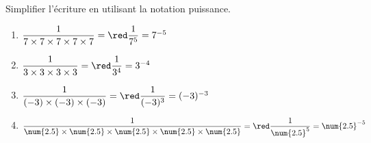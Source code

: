     Simplifier l'écriture en utilisant la notation puissance.
    \begin{spacing}{2}
        \begin{enumerate}
            \item $\dfrac{1}{7\times 7\times 7\times 7\times 7}                                         ={\red \dfrac{1}{7^5}          = 7^{-5}}$
            \item $\dfrac{1}{3\times 3\times 3\times 3}                                                 ={\red \dfrac{1}{3^4}          = 3^{-4}}$
            \item $\dfrac{1}{(-3)\times (-3)\times (-3)}                                                ={\red \dfrac{1}{(-3)^3}       = (-3)^{-3}}$
            \item $\dfrac{1}{\num{2.5}\times \num{2.5}\times \num{2.5}\times \num{2.5}\times \num{2.5}} ={\red \dfrac{1}{\num{2.5}^5}  = \num{2.5}^{-5}}$
        \end{enumerate}
    \end{spacing}
    \vspace*{-10mm}
